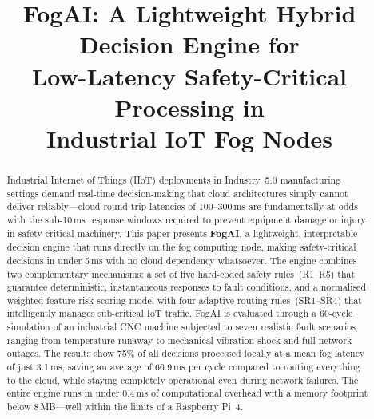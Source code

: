 \documentclass[conference]{IEEEtran}
\begin{document}
\title{FogAI: A Lightweight Hybrid Decision Engine for\\
       Low-Latency Safety-Critical Processing in\\
       Industrial IoT Fog Nodes}

\author{
  \and
}

\maketitle

\begin{abstract}
Industrial Internet of Things (IIoT) deployments in Industry~5.0
manufacturing settings demand real-time decision-making that cloud
architectures simply cannot deliver reliably---cloud round-trip
latencies of 100--300\,ms are fundamentally at odds with the
sub-10\,ms response windows required to prevent equipment damage or
injury in safety-critical machinery.
This paper presents \textbf{FogAI}, a lightweight, interpretable
decision engine that runs directly on the fog computing node, making
safety-critical decisions in under 5\,ms with no cloud dependency
whatsoever.
The engine combines two complementary mechanisms: a set of five
hard-coded safety rules~(R1--R5) that guarantee deterministic,
instantaneous responses to fault conditions, and a normalised
weighted-feature risk scoring model with four adaptive routing
rules~(SR1--SR4) that intelligently manages sub-critical IoT traffic.
FogAI is evaluated through a 60-cycle simulation of an industrial CNC
machine subjected to seven realistic fault scenarios, ranging from
temperature runaway to mechanical vibration shock and full network
outages.
The results show 75\% of all decisions processed locally at a mean
fog latency of just 3.1\,ms, saving an average of 66.9\,ms per cycle
compared to routing everything to the cloud, while staying completely
operational even during network failures.
The entire engine runs in under 0.4\,ms of computational overhead with
a memory footprint below 8\,MB---well within the limits of a Raspberry
Pi~4.
\end{abstract}
\end{document}
